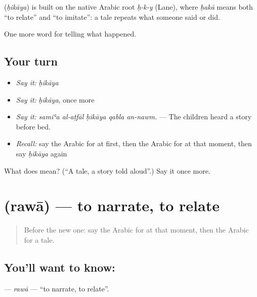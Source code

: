 \begin{cousinweb}
\textbf{} (\emph{ḥikāya}) is built on the native Arabic root \emph{ḥ-k-y} (Lane), where \emph{ḥakā} means both \textquotedblleft{}to relate\textquotedblright{} and \textquotedblleft{}to imitate\textquotedblright{}: a tale repeats what someone said or did.
\end{cousinweb}

\begin{grammarlens}[title={What you've built}]
One more word for telling what happened.
\end{grammarlens}

\subsection*{Your turn}
\begin{itemize}
\raggedright
  \item \emph{Say it:} \emph{ḥikāya}
  \item \emph{Say it:} \emph{ḥikāya}, once more
  \item \emph{Say it:} \emph{samiʿa al-aṭfāl ḥikāya qabla an-nawm.} — The children heard a story before bed.
  \item \emph{Recall:} say the Arabic for at first, then the Arabic for at that moment, then say \emph{ḥikāya} again
\end{itemize}

\begin{tcolorbox}[breakable,colback=teal!4,colframe=teal!35!black,title={Before you move on}]
What does  mean? (\textquotedblleft{}A tale, a story told aloud\textquotedblright{}.) Say it once more.
\end{tcolorbox}
\section[\texorpdfstring{\ar{روى} (rawā)}{روى (rawā)}]{ (rawā) — to narrate, to relate}

\label{lesson:AR-C295-rawa}



\begin{quote}
Before the new one: say the Arabic for at that moment, then the Arabic for a tale.
\end{quote}

\subsection*{You'll want to know: }
\textbf{} — \emph{rawā} — \textquotedblleft{}to narrate, to relate\textquotedblright{}.

